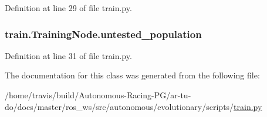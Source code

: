 Definition at line 29 of file train.\+py.

\subsubsection[{\texorpdfstring{untested\+\_\+population}{untested_population}}]{\setlength{\rightskip}{0pt plus 5cm}train.\+Training\+Node.\+untested\+\_\+population}\hypertarget{classtrain_1_1_training_node_a6724c3a14d24c6d8d6a4d7e29126627f}{}\label{classtrain_1_1_training_node_a6724c3a14d24c6d8d6a4d7e29126627f}


Definition at line 31 of file train.\+py.



The documentation for this class was generated from the following file\+:\begin{DoxyCompactItemize}
\item 
/home/travis/build/\+Autonomous-\/\+Racing-\/\+P\+G/ar-\/tu-\/do/docs/master/ros\+\_\+ws/src/autonomous/evolutionary/scripts/\hyperlink{train_8py}{train.\+py}\end{DoxyCompactItemize}
